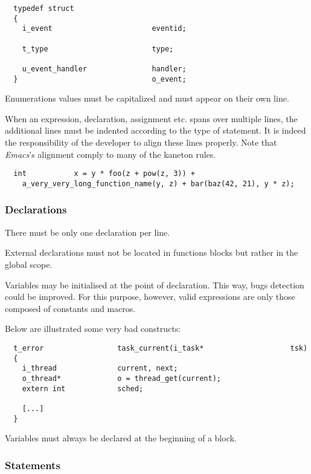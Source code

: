 \begin{verbatim}
  typedef struct
  {
    i_event                       eventid;

    t_type                        type;

    u_event_handler               handler;
  }                               o_event;
\end{verbatim}

Enumerations values must be capitalized and must appear on their own line.

When an expression, declaration, assignment etc. spans over multiple lines,
the additional lines must be indented according to the type of statement.
It is indeed the responsibility of the developer to align these lines
properly. Note that \textit{Emacs}'s alignment comply to many of the
kaneton rules.

\begin{verbatim}
  int           x = y * foo(z + pow(z, 3)) +
    a_very_very_long_function_name(y, z) + bar(baz(42, 21), y * z);
\end{verbatim}


\subsubsection{Declarations}

There must be only one declaration per line.

External declarations must not be located in functions blocks but rather in the
global scope.

Variables may be initialised at the point of declaration. This way, bugs
detection could be improved. For this purpose, however, valid expressions
are only those composed of constants and macros.

Below are illustrated some very bad constructs:

\begin{verbatim}
  t_error                 task_current(i_task*                    tsk)
  {
    i_thread              current, next;
    o_thread*             o = thread_get(current);
    extern int            sched;

    [...]
  }
\end{verbatim}

Variables must always be declared at the beginning of a block.


\subsubsection{Statements}

